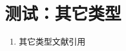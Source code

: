 \section{测试：其它类型}
\begin{refsection}
\begin{enumerate}
  \item 其它类型文献引用\cite{gom,gom1,gom2}
\end{enumerate}

{
\printbibliography%
}
\end{refsection}



